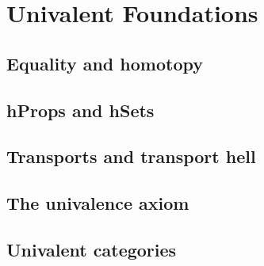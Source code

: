 \chapter{Univalent Foundations}

\section{Equality and homotopy}
\section{hProps and hSets}
\section{Transports and transport hell}
\section{The univalence axiom}
\section{Univalent categories}
